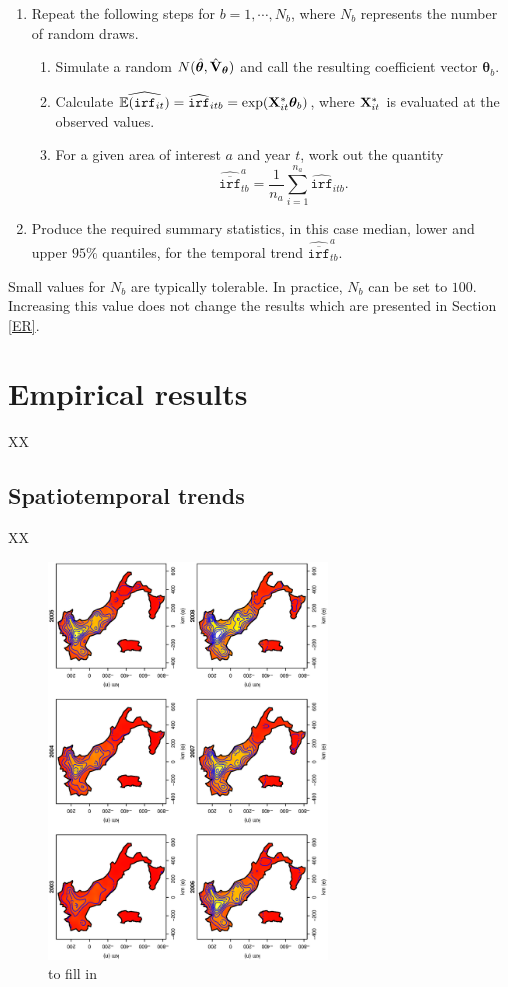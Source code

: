 \documentclass[10pt] {article}
\newcommand{\E}{\mathbb{E}}
\newcommand{\X}{{\bf X}}
\theoremstyle{definition}
\theoremstyle{plain}
\begin{document}
\begin{enumerate}
	\item Repeat the following steps for $b=1,\cdots,N_b$, where $N_b$ represents the number of random draws. 
	   \begin{enumerate}
	      \item Simulate a random $N(\hat{\bm\theta}, \hat{{\bf V}}_{\bm\theta} )$ and call the resulting coefficient vector $\bm\theta_b$.
	      \item Calculate $\widehat{\E(\texttt{irf}_{it})}=\widehat{\texttt{irf}}_{itb}=\exp(\X^*_{it}\bm\theta_b)$, where $\X^*_{it}$ is evaluated at the observed values. 
	      \item For a given area of interest $a$ and year $t$, work out the quantity
	      $$\widehat{\overline{\texttt{irf}}}_{tb}^a=\frac{1}{n_a}\sum_{i=1}^{n_a} \widehat{\texttt{irf}}_{itb}.$$    
	   \end{enumerate}
	\item Produce the required summary statistics, in this case median, lower and upper $95\%$ quantiles, for the temporal trend $\widehat{\overline{\texttt{irf}}}_{tb}^a$.
\end{enumerate}
Small values for $N_b$ are typically tolerable. In practice, $N_b$ can be set to $100$. Increasing this value does not change the results which are presented in Section \ref{ER}.
 

\section{Empirical results \label{ER}}
XX

\subsection{Spatiotemporal trends \label{STT}}
XX


\begin{figure}[htbp]
	\centering
		\includegraphics[width=0.66\textwidth, angle=270]{SmoothPlot.eps}
	\caption{to fill in}
	\label{fig2}
\end{figure}
\end{document}
